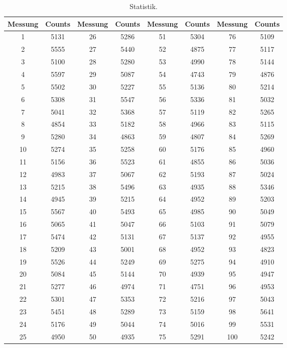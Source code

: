 \begin{table}
  \centering
  \caption{Statistik.}
  \label{tab:3}
  \begin{tabular}{c c|c c|c c|c c}
    \toprule
    Messung & Counts & Messung & Counts & Messung & Counts & Messung & Counts \\
    \midrule
    1 & 5131 & 26 & 5286 & 51 & 5304 & 76 & 5109 \\
    2 & 5555 & 27 & 5440 & 52 & 4875 & 77 & 5117 \\
    3 & 5100 & 28 & 5280 & 53 & 4990 & 78 & 5144 \\
    4 & 5597 & 29 & 5087 & 54 & 4743 & 79 & 4876 \\
    5 & 5502 & 30 & 5227 & 55 & 5136 & 80 & 5214 \\
    6 & 5308 & 31 & 5547 & 56 & 5336 & 81 & 5032 \\
    7 & 5041 & 32 & 5368 & 57 & 5119 & 82 & 5265 \\
    8 & 4854 & 33 & 5182 & 58 & 4966 & 83 & 5115 \\
    9 & 5280 & 34 & 4863 & 59 & 4807 & 84 & 5269 \\
    10 & 5274 & 35 & 5258 & 60 & 5176 & 85 & 4960 \\
    11 & 5156 & 36 & 5523 & 61 & 4855 & 86 & 5036 \\
    12 & 4983 & 37 & 5067 & 62 & 5193 & 87 & 5024 \\
    13 & 5215 & 38 & 5496 & 63 & 4935 & 88 & 5346 \\
    14 & 4945 & 39 & 5215 & 64 & 4952 & 89 & 5203 \\
    15 & 5567 & 40 & 5493 & 65 & 4985 & 90 & 5049 \\
    16 & 5065 & 41 & 5047 & 66 & 5103 & 91 & 5079 \\
    17 & 5474 & 42 & 5131 & 67 & 5137 & 92 & 4955 \\
    18 & 5209 & 43 & 5001 & 68 & 4952 & 93 & 4823 \\
    19 & 5526 & 44 & 5249 & 69 & 5275 & 94 & 4910 \\
    20 & 5084 & 45 & 5144 & 70 & 4939 & 95 & 4947 \\
    21 & 5277 & 46 & 4974 & 71 & 4751 & 96 & 4953 \\
    22 & 5301 & 47 & 5353 & 72 & 5216 & 97 & 5043 \\
    23 & 5451 & 48 & 5289 & 73 & 5159 & 98 & 5641 \\
    24 & 5176 & 49 & 5044 & 74 & 5016 & 99 & 5531 \\
    25 & 4950 & 50 & 4935 & 75 & 5291 & 100 & 5242 \\
    \bottomrule
  \end{tabular}
\end{table}
